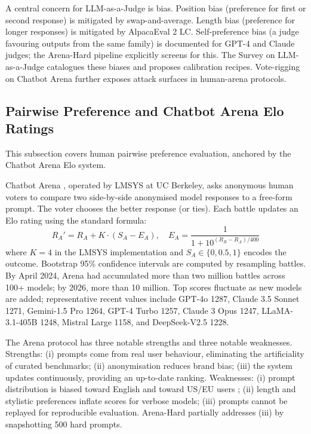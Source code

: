 \documentclass{article}
\begin{document}
A central concern for LLM-as-a-Judge is bias. Position bias (preference for first or second response) is mitigated by swap-and-average. Length bias (preference for longer responses) is mitigated by AlpacaEval 2 LC. Self-preference bias (a judge favouring outputs from the same family) is documented for GPT-4 and Claude judges; the Arena-Hard pipeline explicitly screens for this. The Survey on LLM-as-a-Judge \cite{gu20242024} catalogues these biases and proposes calibration recipes. Vote-rigging on Chatbot Arena \cite{min20252025} further exposes attack surfaces in human-arena protocols.

\subsection{Pairwise Preference and Chatbot Arena Elo Ratings}\label{pairwise-preference-and-chatbot-arena-elo-ratings}

This subsection covers human pairwise preference evaluation, anchored by the Chatbot Arena Elo system.

Chatbot Arena \cite{chiang20242024}, operated by LMSYS at UC Berkeley, asks anonymous human voters to compare two side-by-side anonymised model responses to a free-form prompt. The voter chooses the better response (or ties). Each battle updates an Elo rating using the standard formula:
\[R_A' = R_A + K \cdot (S_A - E_A), \quad E_A = \frac{1}{1 + 10^{(R_B - R_A)/400}}\]
where \(K=4\) in the LMSYS implementation and \(S_A \in \{0, 0.5, 1\}\) encodes the outcome. Bootstrap 95\% confidence intervals are computed by resampling battles. By April 2024, Arena had accumulated more than two million battles across 100+ models; by 2026, more than 10 million. Top scores fluctuate as new models are added; representative recent values include GPT-4o 1287, Claude 3.5 Sonnet 1271, Gemini-1.5 Pro 1264, GPT-4 Turbo 1257, Claude 3 Opus 1247, LLaMA-3.1-405B 1248, Mistral Large 1158, and DeepSeek-V2.5 1228.

The Arena protocol has three notable strengths and three notable weaknesses. Strengths: (i) prompts come from real user behaviour, eliminating the artificiality of curated benchmarks; (ii) anonymisation reduces brand bias; (iii) the system updates continuously, providing an up-to-date ranking. Weaknesses: (i) prompt distribution is biased toward English and toward US/EU users \cite{chiang20242024}; (ii) length and stylistic preferences inflate scores for verbose models; (iii) prompts cannot be replayed for reproducible evaluation. Arena-Hard partially addresses (iii) by snapshotting 500 hard prompts.
\end{document}
